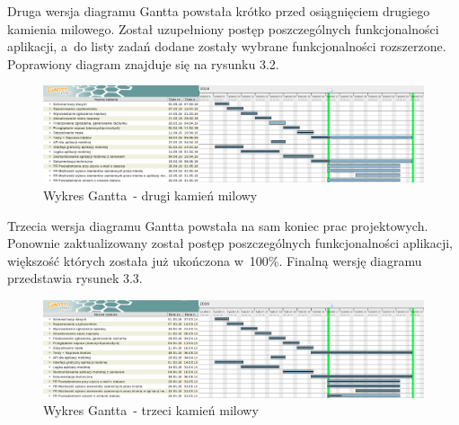 \documentclass[a4paper,11pt]{article}
\begin{document}
\begin{landscape}
Druga wersja diagramu Gantta powstała krótko przed osiągnięciem drugiego kamienia milowego. Został uzupełniony postęp poszczególnych funkcjonalności aplikacji, a~do listy zadań dodane zostały wybrane funkcjonalności rozszerzone. Poprawiony diagram znajduje się na rysunku 3.2.

\begin{figure}[h!]
	\centering
	\includegraphics[width=1.3\textwidth,height=0.7\textheight]{gannth2.png}
	\caption{Wykres Gantta~- drugi kamień milowy}
\end{figure}
\end{landscape}
\begin{landscape}
Trzecia wersja diagramu Gantta powstała na sam koniec prac projektowych. Ponownie zaktualizowany został postęp poszczególnych funkcjonalności aplikacji, większość których została już ukończona w~100\%. Finalną wersję diagramu przedstawia rysunek 3.3.

\begin{figure}[h!]
	\centering
	\includegraphics[width=1.3\textwidth,height=0.7\textheight]{gannth3.png}
	\caption{Wykres Gantta~- trzeci kamień milowy}
\end{figure}
\end{landscape}
\end{document}
